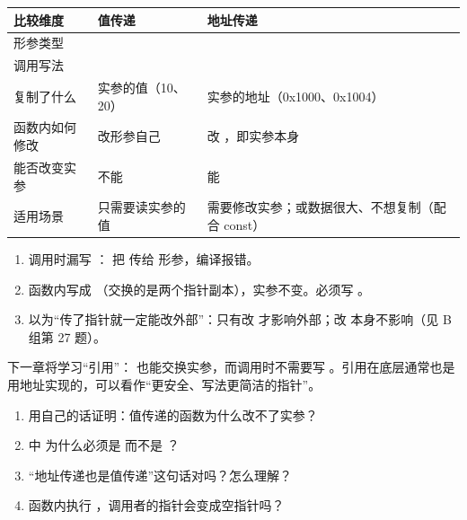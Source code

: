 \begin{center}
\noindent\begin{tabularx}{\linewidth}{@{}p{2.5cm}YY@{}}
\toprule
{}比较维度 & 值传递 & 地址传递 \\
\midrule
形参类型 &  &  \\
调用写法 &  &  \\
复制了什么 & 实参的值（10、20） & 实参的地址（0x1000、0x1004） \\
函数内如何修改 & 改形参自己 & 改 ，即实参本身 \\
能否改变实参 & 不能 & 能 \\
适用场景 & 只需要读实参的值 & 需要修改实参；或数据很大、不想复制（配合 const） \\
\bottomrule
\end{tabularx}
\end{center}

\begin{warningbox}
\begin{enumerate}
  \item 调用时漏写 \cc{\&}： 把  传给  形参，编译报错。
  \item 函数内写成 （交换的是两个指针副本），实参不变。必须写 \cc{*}。
  \item 以为“传了指针就一定能改外部”：只有改  才影响外部；改  本身不影响（见 B 组第 27 题）。
\end{enumerate}
\end{warningbox}

\begin{extendbox}
下一章将学习“引用”： 也能交换实参，而调用时不需要写 \cc{\&}。引用在底层通常也是用地址实现的，可以看作“更安全、写法更简洁的指针”。
\end{extendbox}

\begin{checkbox}
\begin{enumerate}[label=\arabic*.,itemsep=0pt]
  \item 用自己的话证明：值传递的函数为什么改不了实参？
  \item {} 中  为什么必须是  而不是 ？
  \item “地址传递也是值传递”这句话对吗？怎么理解？
  \item 函数内执行 ，调用者的指针会变成空指针吗？
\end{enumerate}
\end{checkbox}

